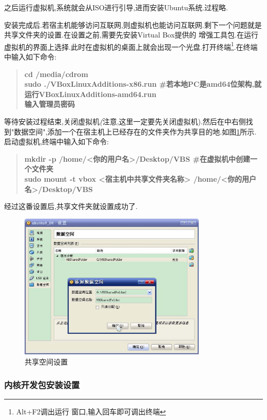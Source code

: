 \documentclass[12pt,a4paper]{article}
\begin{document}
之后运行虚拟机,系统就会从ISO进行引导,进而安装Ubuntu系统.过程略.

安装完成后.若宿主机能够访问互联网,则虚拟机也能访问互联网.剩下一个问题就是共享文件夹的设置.在设置之前,需要先安装Virtual Box提供的
增强工具包.在运行虚拟机的界面上选择.此时在虚拟机的桌面上就会出现一个光盘.打开终端\footnote{Alt+F2调出运行
窗口,输入回车即可调出终端}.在终端中输入如下命令:
\begin{verse}
\textbf{cd /media/cdrom\\sudo ./VBoxLinuxAdditions-x86.run \#若本地PC是amd64位架构,就运行VBoxLinuxAdditions-amd64.run\\输入管理员密码}
\end{verse}
等待安装过程结束,关闭虚拟机\textit(注意,这里一定要先关闭虚拟机).然后在中右侧找到"数据空间",添加一个在宿主机上已经存在的文件夹作为共享目的地.如图\ref{f_sf}所示.
启动虚拟机,终端中输入如下命令:
\begin{verse}
\textbf{mkdir -p /home/<你的用户名>/Desktop/VBS \#在虚拟机中创建一个文件夹\\sudo mount -t vbox <宿主机中共享文件夹名称> 
/home/<你的用户名>/Desktop/VBS}
\end{verse}
经过这番设置后,共享文件夹就设置成功了.
\begin{figure}[!bthp]
\centering
\includegraphics[width=0.8\textwidth,scale=0.8]{pic/f_vb_setting_sf.eps}
\caption{共享空间设置\label{f_sf}}
\end{figure}
\subsubsection{内核开发包安装设置}
\end{document}
